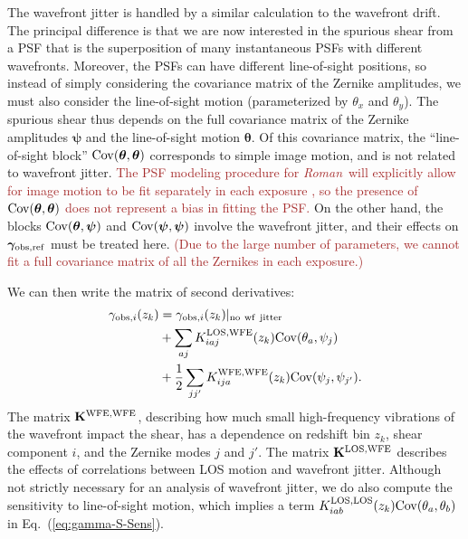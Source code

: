 \documentclass[usenatbib]{mnras}
\newcommand{\wfirst}{{\slshape Roman}}
\newcommand{\changetext}[1]{\textcolor{brown}{#1}}
\begin{document}
The wavefront jitter is handled by a similar calculation to the
wavefront drift. The principal difference is that we are now
interested in the spurious shear from a PSF that is the superposition
of many instantaneous PSFs with different wavefronts. Moreover, the
PSFs can have different line-of-sight positions, so instead of simply
considering the covariance matrix of the Zernike amplitudes, we must
also consider the line-of-sight motion (parameterized by $\theta_x$
and $\theta_y$). The spurious shear thus depends on the full
covariance matrix of the Zernike amplitudes ${\boldsymbol\psi}$ and
the line-of-sight motion ${\boldsymbol\theta}$. Of this covariance
matrix, the ``line-of-sight block'' ${\rm
Cov}({\boldsymbol\theta},{\boldsymbol\theta})$ corresponds to simple
image motion, and is not related to wavefront jitter. \changetext{The PSF modeling procedure for \wfirst\ will explicitly allow for image motion to be fit separately in each exposure \citep{2012SPIE.8442E..10J}, so the presence of ${\rm
Cov}({\boldsymbol\theta},{\boldsymbol\theta})$ does not represent a bias in fitting the PSF.} On the other
hand, the blocks ${\rm Cov}({\boldsymbol\theta},{\boldsymbol\psi})$
and ${\rm Cov}({\boldsymbol\psi},{\boldsymbol\psi})$ involve the
wavefront jitter, and their effects on ${\boldsymbol\gamma}_{\rm
obs,ref}$ must be treated here. \changetext{(Due to the large number of parameters, we cannot fit a full covariance matrix of all the Zernikes in each exposure.)}

We can then write the matrix of second derivatives:
\begin{align}
\gamma_{{\rm obs},i}(z_k) &= \gamma_{{\rm obs},i}(z_k)|_{\rm no~wf~jitter}\nonumber\\
&+ \sum_{aj} K^{\rm LOS,WFE}_{iaj}(z_k) {\rm Cov}({\theta}_a,{\psi}_j)\nonumber\\
&+ \frac12 \sum_{jj'} K^{\rm WFE,WFE}_{ija}(z_k) {\rm Cov}({\psi}_j,{\psi}_{j'}).
\label{eq:gamma-S-Sens}
\end{align}
The matrix ${\bf K}^{\rm WFE,WFE}$, describing how much small
high-frequency vibrations of the wavefront impact the shear, has a
dependence on redshift bin $z_k$, shear component $i$, and the Zernike
modes $j$ and $j'$. The matrix ${\bf K}^{\rm LOS,WFE}$ describes the
effects of correlations between LOS motion and wavefront jitter.
Although not strictly necessary for an analysis of wavefront jitter, we do also compute the sensitivity to line-of-sight motion, which implies a term $K^{\rm LOS,LOS}_{iab}(z_k) {\rm Cov}({\theta}_a,{\theta}_b)$ in Eq.~(\ref{eq:gamma-S-Sens}).
\end{document}
